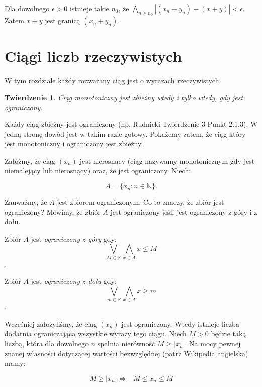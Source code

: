 \documentclass[a4paper,oneside,openright,11pt]{article}
\newtheorem{theorem}{Twierdzenie}
\numberwithin{equation}{section}
\begin{document}
\vspace{10mm}
Dla dowolnego $\epsilon > 0$ istnieje takie $n_0$, że $\underset{n \geq n_0}{\bigwedge} |(x_{n} + y_{n}) - (x + y)| < \epsilon$. Zatem $x+y$
jest granicą $(x_{n} + y_{n})$.


\section{Ciągi liczb rzeczywistych}

W tym rozdziale każdy rozważany ciąg jest o wyrazach rzeczywistych.

\begin{theorem}
    
    Ciąg monotoniczny jest zbieżny wtedy i tylko wtedy, gdy jest ograniczony.

\end{theorem}


Każdy ciąg zbieżny jest ograniczony (np. Rudnicki Twierdzenie 3 Punkt 2.1.3). W jedną stronę dowód jest w takim razie gotowy.
Pokażemy zatem, że ciąg który jest monotoniczny i ograniczony jest zbieżny.
\vspace{10mm}


\noindent
Załóżmy, że ciąg $(x_n)$ jest nierosnący (ciąg nazywamy monotonicznym gdy jest niemalejący lub nierosnący) oraz, że jest ograniczony.
Niech: 

\begin{equation*}
    A = \{ x_n : n \in \mathbb{N} \}.
\end{equation*}


\noindent
Zauważmy, że $A$ jest zbiorem ograniczonym. Co to znaczy, że zbiór jest ograniczony? Mówimy, że zbiór $A$ jest ograniczony jeśli
jest ograniczony z góry i z dołu.
\vspace{10mm}

Zbiór $A$ jest \emph{ograniczony z góry} gdy: $$\bigvee_{M \in \mathbb{R}}  \bigwedge_{x \in A} x \leq M$$.

Zbiór $A$ jest \emph{ograniczony z dołu} gdy: $$\bigvee_{m \in \mathbb{R}}  \bigwedge_{x \in A} x \geq m$$.


Wcześniej założyliśmy, że ciąg $(x_n)$ jest ograniczony. Wtedy istnieje liczba dodatnia ograniczająca wszystkie wyrazy tego ciągu. Niech $M > 0$ będzie taką liczbą, 
która dla dowolnego $n$ spełnia nierówność $M \geq |x_n|$. Na mocy pewnej znanej własności dotyczącej wartości bezwzględnej (patrz Wikipedia angielska) mamy:


\begin{equation*}
    M \geq |x_n| \iff -M \leq x_n \leq M
\end{equation*}
\end{document}
